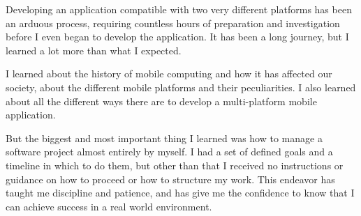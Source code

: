 Developing an application compatible with two very different platforms has been an arduous process, requiring countless hours of preparation and investigation before I even began to develop the application. It has been a long journey, but I learned a lot more than what I expected.

I learned about the history of mobile computing and how it has affected our society, about the different mobile platforms and their peculiarities. I also learned about all the different ways there are to develop a multi-platform mobile application.

But the biggest and most important thing I learned was how to manage a software project almost entirely by myself. I had a set of defined goals and a timeline in which to do them, but other than that I received no instructions or guidance on how to proceed or how to structure my work. This endeavor has taught me discipline and patience, and has give me the confidence to know that I can achieve success in a real world environment.








